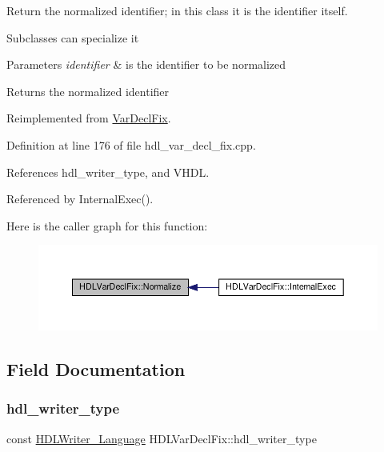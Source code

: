 Return the normalized identifier; in this class it is the identifier itself. 

Subclasses can specialize it 
\begin{DoxyParams}{Parameters}
{\em identifier} & is the identifier to be normalized \\
\hline
\end{DoxyParams}
\begin{DoxyReturn}{Returns}
the normalized identifier 
\end{DoxyReturn}


Reimplemented from \hyperlink{classVarDeclFix_a20e7d8b00a37444085e46773a6483d3b}{Var\+Decl\+Fix}.



Definition at line 176 of file hdl\+\_\+var\+\_\+decl\+\_\+fix.\+cpp.



References hdl\+\_\+writer\+\_\+type, and V\+H\+DL.



Referenced by Internal\+Exec().

Here is the caller graph for this function\+:
\nopagebreak
\begin{figure}[H]
\begin{center}
\leavevmode
\includegraphics[width=350pt]{d8/d32/classHDLVarDeclFix_ae06ae2d02410b645529a7b03fad9f0aa_icgraph}
\end{center}
\end{figure}


\subsection{Field Documentation}
\mbox{\label{classHDLVarDeclFix_ae5d27057634b5611bedd28601eefe585}} 
\subsubsection{\texorpdfstring{hdl\+\_\+writer\+\_\+type}{hdl\_writer\_type}}
{\footnotesize\ttfamily const \hyperlink{language__writer_8hpp_a890069761ca3ce361c42684c789d886c}{H\+D\+L\+Writer\+\_\+\+Language} H\+D\+L\+Var\+Decl\+Fix\+::hdl\+\_\+writer\+\_\+type\hspace{0.3cm}{\ttfamily [protected]}}



